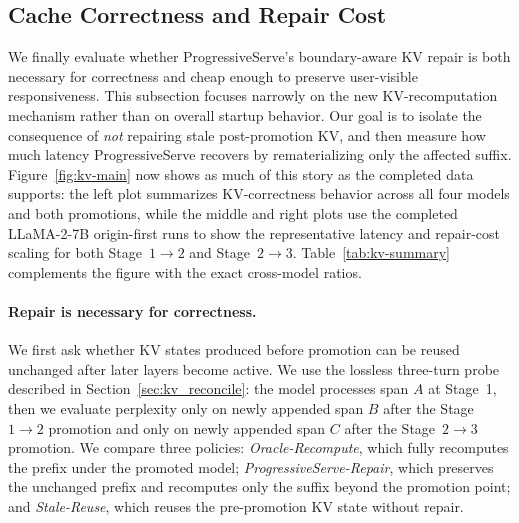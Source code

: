 \subsection{Cache Correctness and Repair Cost}
\label{sec:eval-kv}

We finally evaluate whether ProgressiveServe's boundary-aware KV repair is both necessary for correctness and cheap enough to preserve user-visible responsiveness.
This subsection focuses narrowly on the new KV-recomputation mechanism rather than on overall startup behavior.
Our goal is to isolate the consequence of \emph{not} repairing stale post-promotion KV, and then measure how much latency ProgressiveServe recovers by rematerializing only the affected suffix.
Figure~\ref{fig:kv-main} now shows as much of this story as the completed data supports: the left plot summarizes KV-correctness behavior across all four models and both promotions, while the middle and right plots use the completed LLaMA-2-7B origin-first runs to show the representative latency and repair-cost scaling for both Stage~\(1\!\rightarrow\!2\) and Stage~\(2\!\rightarrow\!3\).
Table~\ref{tab:kv-summary} complements the figure with the exact cross-model ratios.

\paragraph{Repair is necessary for correctness.}
We first ask whether KV states produced before promotion can be reused unchanged after later layers become active.
We use the lossless three-turn probe described in Section~\ref{sec:kv_reconcile}: the model processes span \(A\) at Stage~1, then we evaluate perplexity only on newly appended span \(B\) after the Stage~\(1\!\rightarrow\!2\) promotion and only on newly appended span \(C\) after the Stage~\(2\!\rightarrow\!3\) promotion.
We compare three policies:
\textit{Oracle-Recompute}, which fully recomputes the prefix under the promoted model;
\textit{ProgressiveServe-Repair}, which preserves the unchanged prefix and recomputes only the suffix beyond the promotion point;
and \textit{Stale-Reuse}, which reuses the pre-promotion KV state without repair.

